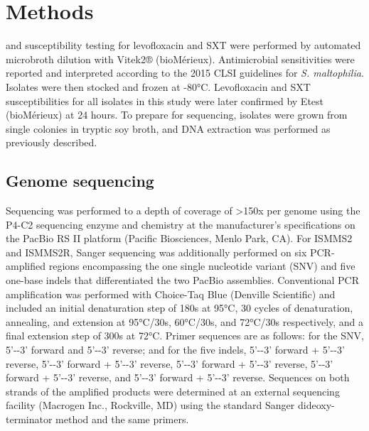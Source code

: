 \section{Methods}

 and susceptibility testing for levofloxacin and SXT were performed by automated microbroth dilution with Vitek2® (bioMérieux). Antimicrobial sensitivities were reported and interpreted according to the 2015 CLSI guidelines for \emph{S. maltophilia}.\autocite{ClinicalandLaboratoryStandardsInstitute2015} Isolates were then stocked and frozen at -80°C. Levofloxacin and SXT susceptibilities for all isolates in this study were later confirmed by Etest (bioMérieux) at 24 hours. To prepare for sequencing, isolates were grown from single colonies in tryptic soy broth, and DNA extraction was performed as previously described.\autocite{Altman2014}

\subsection{Genome sequencing}

Sequencing was performed to a depth of coverage of >150x per genome using the P4-C2 sequencing enzyme and chemistry at the manufacturer’s specifications on the PacBio RS II platform (Pacific Biosciences, Menlo Park, CA). For ISMMS2 and ISMMS2R, Sanger sequencing was additionally performed on six PCR-amplified regions encompassing the one single nucleotide variant (SNV) and five one-base indels that differentiated the two PacBio assemblies. Conventional PCR amplification was performed with Choice-Taq Blue (Denville Scientific) and included an initial denaturation step of 180s at 95°C, 30 cycles of denaturation, annealing, and extension at 95°C/30s, 60°C/30s, and 72°C/30s respectively, and a final extension step of 300s at 72°C. Primer sequences are as follows: for the SNV, 5’-\texttt{}-3’ forward and 5’-\texttt{}-3’ reverse; and for the five indels, 5’-\texttt{}-3’ forward + 5’-\texttt{}-3’ reverse, 5’-\texttt{}-3’ forward + 5’-\texttt{}-3’ reverse, 5’-\texttt{}-3’ forward + 5’-\texttt{}-3’ reverse, 5’-\texttt{}-3’ forward + 5’-\texttt{}-3’ reverse, and 5’-\texttt{}-3’ forward + 5’-\texttt{}-3’ reverse. Sequences on both strands of the amplified products were determined at an external sequencing facility (Macrogen Inc., Rockville, MD) using the standard Sanger dideoxy-terminator method and the same primers.

